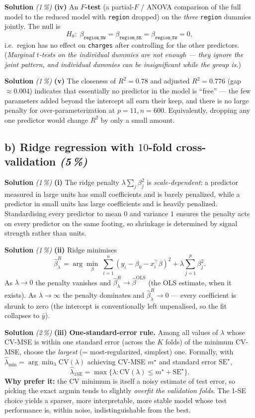 \documentclass[11pt,a4paper]{article}
\newcommand{\subpoints}[1]{\textit{(#1\,\%)}}
\newcommand{\sol}{\noindent\textbf{Solution}}
\begin{document}
\medskip
\sol{} \subpoints{1} \textbf{(iv)} An \textbf{$F$-test} (a partial-$F$ / ANOVA comparison of the
full model to the reduced model with \texttt{region} dropped) on the \emph{three}
\texttt{region} dummies jointly. The null is
$$H_0:\;\beta_{\texttt{region\_NW}} = \beta_{\texttt{region\_SE}} = \beta_{\texttt{region\_SW}} = 0,$$
i.e.\ region has no effect on \texttt{charges} after controlling for the other predictors.
(\emph{Marginal $t$-tests on the individual dummies are not enough --- they ignore the joint
pattern, and individual dummies can be insignificant while the group is.})

\medskip
\sol{} \subpoints{1} \textbf{(v)} The closeness of $R^2 = 0.78$ and adjusted $R^2 = 0.776$ (gap
$\approx 0.004$) indicates that essentially no predictor in the model is ``free'' --- the few
parameters added beyond the intercept all earn their keep, and there is no large penalty for
over-parameterization at $p=11,n=600$. Equivalently, dropping any one predictor would change
$R^2$ by only a small amount.

\subsection*{b) Ridge regression with $10$-fold cross-validation \subpoints{5}}

\sol{} \subpoints{1} \textbf{(i)} The ridge penalty $\lambda\sum_j\beta_j^2$ is
\emph{scale-dependent}: a predictor measured in large units has small coefficients and is barely
penalized, while a predictor in small units has large coefficients and is heavily penalized.
Standardising every predictor to mean $0$ and variance $1$ ensures the penalty acts on every
predictor on the same footing, so shrinkage is determined by signal strength rather than units.

\medskip
\sol{} \subpoints{1} \textbf{(ii)} Ridge minimises
$$\hat\beta^R_\lambda = \arg\min_\beta\;\sum_{i=1}^n(y_i - \beta_0 - x_i^\top\beta)^2
   + \lambda\sum_{j=1}^p\beta_j^2.$$
As $\lambda\to 0$ the penalty vanishes and $\hat\beta^R_\lambda\to\hat\beta^{\mathrm{OLS}}$ (the
OLS estimate, when it exists). As $\lambda\to\infty$ the penalty dominates and
$\hat\beta^R_\lambda\to 0$ --- every coefficient is shrunk to zero (the intercept is conventionally
left unpenalised, so the fit collapses to $\bar y$).

\medskip
\sol{} \subpoints{2} \textbf{(iii)} \textbf{One-standard-error rule.} Among all values of
$\lambda$ whose CV-MSE is within one standard error (across the $K$ folds) of the minimum
CV-MSE, choose the \emph{largest} (= most-regularized, simplest) one. Formally, with
$\hat\lambda_{\min}=\arg\min_\lambda\mathrm{CV}(\lambda)$ achieving CV-MSE $m^\star$ and standard
error $\mathrm{SE}^\star$,
$$\hat\lambda_{1\mathrm{SE}} = \max\bigl\{\lambda:\mathrm{CV}(\lambda)\leq m^\star+\mathrm{SE}^\star\bigr\}.$$
\textbf{Why prefer it:} the CV minimum is itself a noisy estimate of test error, so picking the
exact argmin tends to slightly \emph{overfit the validation folds}. The 1-SE choice yields a
sparser, more interpretable, more stable model whose test performance is, within noise,
indistinguishable from the best.
\end{document}
